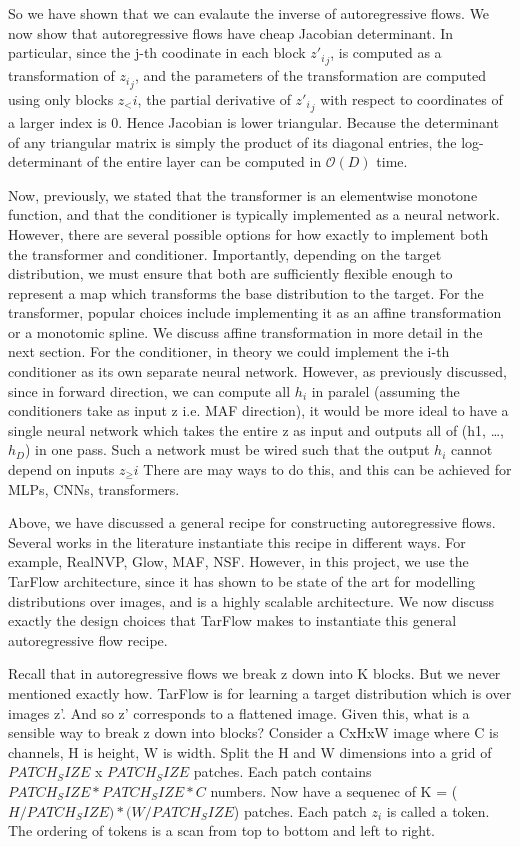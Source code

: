 \documentclass[12pt,a4paper]{report}
\begin{document}
So we have shown that we can evalaute the inverse of autoregressive flows. 
We now show that autoregressive flows have cheap Jacobian determinant. 
In particular, since the j-th coodinate in each block ${z'_i}_j$, is computed as a transformation of ${z_i}_j$, and the parameters of the transformation are computed using only blocks $z_<i$, the partial derivative of ${z'_i}_j$ with respect to coordinates of a larger index is 0. Hence Jacobian is lower triangular. %
Because the determinant of any triangular matrix is simply the product of its diagonal entries, the log-determinant of the entire layer can be computed in $\mathcal{O}(D)$ time. 

Now, previously, we stated that the transformer is an elementwise monotone function, and that the conditioner is typically implemented as a neural network.
However, there are several possible options for how exactly to implement both the transformer and conditioner. 
Importantly, depending on the target distribution, we must ensure that both are sufficiently flexible enough to represent a map which transforms the base distribution to the target. 
For the transformer, popular choices include implementing it as an affine transformation or a monotomic spline. We discuss affine transformation in more detail in the next section. 
For the conditioner, in theory we could implement the i-th conditioner as its own separate neural network. 
However, as previously discussed, since in forward direction, we can compute all $h_i$ in paralel (assuming the conditioners take as input z i.e. MAF direction), it would be more ideal to have a single neural network which takes the entire z as input and outputs all of (h1, …, $h_D$) in one pass. 
Such a network must be wired such that the output $h_i$ cannot depend on inputs $z_≥i$ 
There are may ways to do this, and this can be achieved for MLPs, CNNs, transformers. 

Above, we have discussed a general recipe for constructing autoregressive flows. 
Several works in the literature instantiate this recipe in different ways. 
For example, RealNVP, Glow, MAF, NSF. 
However, in this project, we use the TarFlow architecture, since it has shown to be state of the art for modelling distributions over images, and is a highly scalable architecture. 
We now discuss exactly the design choices that TarFlow makes to instantiate this general autoregressive flow recipe. 

Recall that in autoregressive flows we break z down into K blocks. 
But we never mentioned exactly how. 
TarFlow is for learning a target distribution which is over images z'. 
And so z' corresponds to a flattened image. 
Given this, what is a sensible way to break z down into blocks?
Consider a CxHxW image where C is channels, H is height, W is width. 
Split the H and W dimensions into a grid of $PATCH_SIZE$ x $PATCH_SIZE$ patches. 
Each patch contains $PATCH_SIZE*PATCH_SIZE*C$ numbers. 
Now have a sequenec of K = ($H/PATCH_SIZE)*(W/PATCH_SIZE$) patches. 
Each patch $z_i$ is called a token. 
The ordering of tokens is a scan from top to bottom and left to right. 
\end{document}
